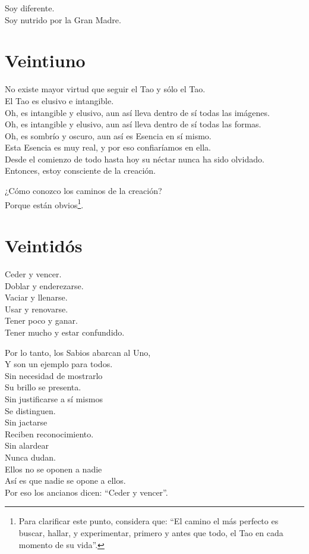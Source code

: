 \documentclass[hidelinks]{memoir}
\begin{document}
	Soy diferente.\\
	Soy nutrido por la Gran Madre.
	
	
	
	\chapter*{Veintiuno}
	
	No existe mayor virtud que seguir el Tao y sólo el Tao.\\
	El Tao es elusivo e intangible.\\
	Oh, es intangible y elusivo, aun así lleva dentro de sí todas las
	imágenes.\\
	Oh, es intangible y elusivo, aun así lleva dentro de sí todas las
	formas.\\
	Oh, es sombrío y oscuro, aun así es Esencia en sí mismo.\\
	Esta Esencia es muy real, y por eso confiaríamos en ella.\\
	Desde el comienzo de todo hasta hoy su néctar nunca ha sido olvidado.\\
	Entonces, estoy consciente de la creación.
	
	¿Cómo conozco los caminos de la creación?\\
	Porque están obvios\footnote{Para clarificar este punto, considera que: ``El camino el más perfecto
		es buscar, hallar, y experimentar, primero y antes que todo, el Tao en
		cada momento de su vida''.}.
	
	\chapter*{Veintidós}
	
	Ceder y vencer.\\
	Doblar y enderezarse.\\
	Vaciar y llenarse.\\
	Usar y renovarse.\\
	Tener poco y ganar.\\
	Tener mucho y estar confundido.
	
	Por lo tanto, los Sabios abarcan al Uno,\\
	Y son un ejemplo para todos.\\
	Sin necesidad de mostrarlo\\
	Su brillo se presenta.\\
	Sin justificarse a sí mismos\\
	Se distinguen.\\
	Sin jactarse\\
	Reciben reconocimiento.\\
	Sin alardear\\
	Nunca dudan.\\
	Ellos no se oponen a nadie\\
	Así es que nadie se opone a ellos.\\
	Por eso los ancianos dicen: ``Ceder y vencer''.
	
\end{document}
